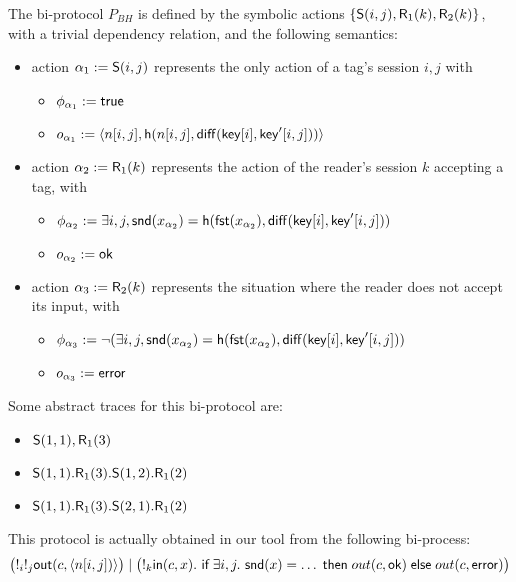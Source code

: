 \begin{example}
  \label{ex:basic-hash-bi-process}
  The bi-protocol $P_{BH}$ is defined by the symbolic actions
  $\{\textsf{S}(i,j),\textsf{R}_1(k),\textsf{R}_2(k)\}$, with a trivial dependency relation,
  and the following semantics:
    \begin{itemize}
      \item action $\alpha_1 := \textsf{S}(i,j)$ represents the only
        action of a tag's session $i,j$ with
        \begin{itemize}
          \item $\phi_{\alpha_1} := \textsf{true}$
          \item $o_{\alpha_1} := \langle n[i,j], \mathsf{h}(n[i,j],\mathsf{diff}(\mathsf{key}[i],\mathsf{key}'[i,j])) \rangle$
        \end{itemize}
      \item action $\alpha_2 := \textsf{R}_1(k)$ represents the action
        of the reader's session $k$ accepting a tag, with
        \begin{itemize}
          \item $\phi_{\alpha_2} := \exists i,j, \mathsf{snd}(x_{\alpha_2}) =
            \mathsf{h}(\mathsf{fst}(x_{\alpha_2}),\mathsf{diff}(\mathsf{key}[i],\mathsf{key}'[i,j]))$
          \item $o_{\alpha_2} := \mathsf{ok}$
        \end{itemize}
      \item action $\alpha_3 := \textsf{R}_2(k)$ represents the situation
        where the reader does not accept its input, with
        \begin{itemize}
          \item $\phi_{\alpha_3} := \neg (\exists i,j, \mathsf{snd}(x_{\alpha_2}) =  \mathsf{h}(\mathsf{fst}(x_{\alpha_2}),\mathsf{diff}(\mathsf{key}[i],\mathsf{key}'[i,j]))$
          \item $o_{\alpha_3} := \mathsf{error}$
        \end{itemize}
    \end{itemize}
  Some abstract traces for this bi-protocol are:
  \begin{itemize}
    \item $\textsf{S}(1,1),\textsf{R}_1(3)$
    \item $\textsf{S}(1,1).\textsf{R}_1(3).\textsf{S}(1,2).\textsf{R}_1(2)$
    \item $\textsf{S}(1,1).\textsf{R}_1(3).\textsf{S}(2,1).\textsf{R}_1(2)$
  \end{itemize}
  This protocol is actually obtained in our tool from the following
  bi-process:
  $$\bigl(!_i !_j \mathsf{out}(c,\langle  n[i,j]) \rangle\bigr) \mid
   \bigl(!_k \mathsf{in}(c,x).~ \textsf{if}\; \exists i,j.~ \mathsf{snd}(x) = \ldots \;\textsf{then}\;
    out(c,\mathsf{ok}) \;\textsf{else}\; out(c,\mathsf{error})\bigr)$$
\end{example}


